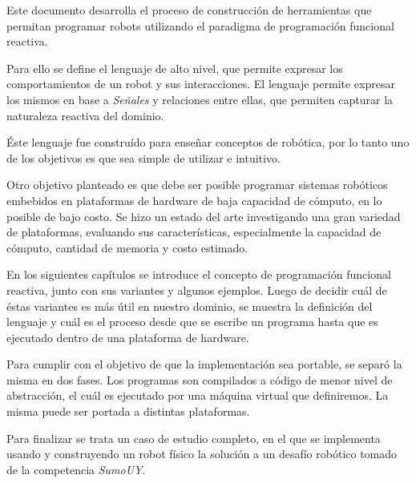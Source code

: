 
  Este documento desarrolla el proceso de construcción de
herramientas que permitan programar robots utilizando
el paradigma de programación funcional reactiva.

  Para ello se define el lenguaje \frob{} de alto nivel,
que permite expresar los comportamientos de un robot y sus
interacciones.
  El lenguaje permite expresar los mismos en base a
\emph{Señales} y relaciones entre ellas, que permiten
capturar la naturaleza reactiva del dominio.

  Éste lenguaje fue construído para
enseñar conceptos de robótica, por lo tanto
uno de los objetivos es que sea simple de
utilizar e intuitivo.

  Otro objetivo planteado es que debe ser posible programar
sistemas robóticos embebidos en plataformas de
hardware de baja capacidad de cómputo, en lo posible de
bajo costo.
  Se hizo un estado del arte investigando una gran variedad
de plataformas, evaluando sus características,
especialmente la capacidad de cómputo, cantidad de memoria y
costo estimado.

  En los siguientes capítulos se introduce el concepto de
programación funcional reactiva, junto con sus variantes y
algunos ejemplos.
  Luego de decidir cuál de éstas variantes es más útil
en nuestro dominio, se muestra la definición del lenguaje
\frob{} y cuál es el proceso desde que se escribe un programa
hasta que es ejecutado dentro de una plataforma de hardware.

  Para cumplir con el objetivo de que la implementación sea
portable, se separó la misma en dos fases. Los programas son
compilados a código \alf{} de menor nivel de abstracción,
el cuál es ejecutado por una máquina virtual que definiremos.
  La misma puede ser portada a distintas plataformas.

  Para finalizar se trata un caso de estudio completo, en el
que se implementa usando \frob{} y construyendo un robot físico
la solución a un desafío robótico tomado de la
competencia \textit{SumoUY}.
